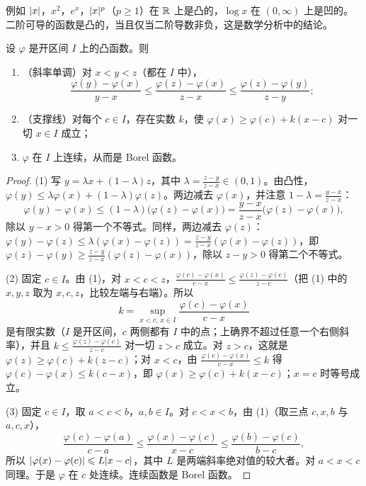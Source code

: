 例如 $\lvert x\rvert$，$x^2$，$e^x$，$\lvert x\rvert^p$（$p\geqslant1$）在 $\mathbb{R}$ 上是凸的，$\log x$ 在 $(0,\infty)$ 上是凹的。二阶可导的函数是凸的，当且仅当二阶导数非负，这是数学分析中的结论。

\begin{lemma}[凸函数的支撑线]\label{lem:expectation:supporting-line}
设 $\varphi$ 是开区间 $I$ 上的凸函数。则
\begin{enumerate}
\item （斜率单调）对 $x<y<z$（都在 $I$ 中），
\[
\frac{\varphi(y)-\varphi(x)}{y-x}\leqslant\frac{\varphi(z)-\varphi(x)}{z-x}\leqslant\frac{\varphi(z)-\varphi(y)}{z-y};
\]
\item （支撑线）对每个 $c\in I$，存在实数 $k$，使 $\varphi(x)\geqslant\varphi(c)+k(x-c)$ 对一切 $x\in I$ 成立；
\item $\varphi$ 在 $I$ 上连续，从而是 Borel 函数。
\end{enumerate}
\end{lemma}
\begin{proof}
(1) 写 $y=\lambda x+(1-\lambda)z$，其中 $\lambda=\frac{z-y}{z-x}\in(0,1)$。由凸性，$\varphi(y)\leqslant\lambda\varphi(x)+(1-\lambda)\varphi(z)$。两边减去 $\varphi(x)$，并注意 $1-\lambda=\frac{y-x}{z-x}$：
\[
\varphi(y)-\varphi(x)\leqslant(1-\lambda)\bigl(\varphi(z)-\varphi(x)\bigr)=\frac{y-x}{z-x}\bigl(\varphi(z)-\varphi(x)\bigr),
\]
除以 $y-x>0$ 得第一个不等式。同样，两边减去 $\varphi(z)$：$\varphi(y)-\varphi(z)\leqslant\lambda(\varphi(x)-\varphi(z))=\frac{z-y}{z-x}(\varphi(x)-\varphi(z))$，即 $\varphi(z)-\varphi(y)\geqslant\frac{z-y}{z-x}(\varphi(z)-\varphi(x))$，除以 $z-y>0$ 得第二个不等式。

(2) 固定 $c\in I$。由 (1)，对 $x<c<z$，$\frac{\varphi(c)-\varphi(x)}{c-x}\leqslant\frac{\varphi(z)-\varphi(c)}{z-c}$（把 (1) 中的 $x,y,z$ 取为 $x,c,z$，比较左端与右端）。所以
\[
k=\sup_{x<c,\,x\in I}\frac{\varphi(c)-\varphi(x)}{c-x}
\]
是有限实数（$I$ 是开区间，$c$ 两侧都有 $I$ 中的点；上确界不超过任意一个右侧斜率），并且 $k\leqslant\frac{\varphi(z)-\varphi(c)}{z-c}$ 对一切 $z>c$ 成立。对 $z>c$，这就是 $\varphi(z)\geqslant\varphi(c)+k(z-c)$；对 $x<c$，由 $\frac{\varphi(c)-\varphi(x)}{c-x}\leqslant k$ 得 $\varphi(c)-\varphi(x)\leqslant k(c-x)$，即 $\varphi(x)\geqslant\varphi(c)+k(x-c)$；$x=c$ 时等号成立。

(3) 固定 $c\in I$，取 $a<c<b$，$a,b\in I$。对 $c<x<b$，由 (1)（取三点 $c,x,b$ 与 $a,c,x$），
\[
\frac{\varphi(c)-\varphi(a)}{c-a}\leqslant\frac{\varphi(x)-\varphi(c)}{x-c}\leqslant\frac{\varphi(b)-\varphi(c)}{b-c},
\]
所以 $\lvert \varphi(x)-\varphi(c)\rvert\leqslant L\lvert x-c\rvert$，其中 $L$ 是两端斜率绝对值的较大者。对 $a<x<c$ 同理。于是 $\varphi$ 在 $c$ 处连续。连续函数是 Borel 函数。
\end{proof}

